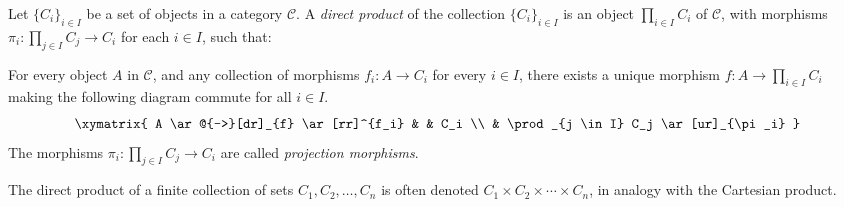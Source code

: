 \documentclass[12pt]{article}
\begin{document}
Let $\{C_i\}_{i \in I}$ be a set of objects in a category $\mathcal{C}$. A \emph{direct product} of the collection $\{C_i\}_{i \in I}$ is an object $\prod_{i \in I} C_i$ of $\mathcal{C}$, with morphisms $\pi_i\colon \prod_{j \in I} C_j \to C_i$ for each $i \in I$, such that:

For every object $A$ in $\mathcal{C}$, and any collection of morphisms $f_i\colon A \to C_i$ for every $i \in I$, there exists a unique morphism $f\colon A \to \prod_{i \in I} C_i$ making the following diagram commute for all $i \in I$.
\[
\xymatrix{
A \ar@{-->}[dr]_{f} \ar[rr]^{f_i} & & C_i  \\
& \prod_{j \in I} C_j \ar[ur]_{\pi_i}
}
\]
The morphisms $\pi_i\colon \prod_{j \in I} C_j \to C_i$ are called \emph{projection morphisms}.

The direct product of a finite collection of sets $C_1, C_2, \ldots, C_n$ is often denoted $C_1 \times C_2 \times \cdots \times C_n$, in analogy with the Cartesian product.
\end{document}

